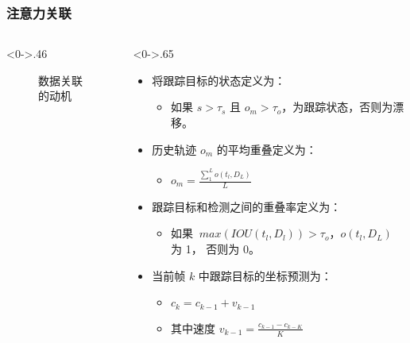 \begin{frame}
	\frametitle{注意力关联}
	\begin{columns}[T] %
		\begin{column}<0->{.46\textwidth}
			\begin{figure}[thpb]
				\centering
				\caption{数据关联的动机}
			\end{figure}
		\end{column}
		\hfill%
		\begin{column}<0->{.65\textwidth}
			\begin{itemize}
				\item<1-> 将跟踪目标的状态定义为：
				\begin{itemize}
					\item<1-> 如果 $ s > \tau_s $ 且 $ o_{m} > \tau_o $，为跟踪状态，否则为漂移。
				\end{itemize}
			
				\item<1-> 历史轨迹 $o_{m}$ 的平均重叠定义为：
				\begin{itemize}
					\item<1-> $ o_{m}=\frac{\sum_{1}^{L} o\left(t_l,D_L\right)}{L} $
				\end{itemize}
				
				\item <1-> 跟踪目标和检测之间的重叠率定义为：
				\begin{itemize}
					\item<1-> 如果 $ \ max \left(IOU \left(t_l,D_l\right) \right) > \tau_o $，$ o \left(t_l,D_L\right) $ 为 1， 否则为 0。
				\end{itemize}
				
				\item <1-> 当前帧 $k$ 中跟踪目标的坐标预测为：
				\begin{itemize}
					\item <1-> $ c_k=c_{k-1}+v_{k-1} $
					\item <1-> 其中速度 $ v_{k-1}=\frac{c_{k-1}-c_{k-K}}{K} $
				\end{itemize}
			\end{itemize}
		\end{column}%
	\end{columns}
\end{frame}


